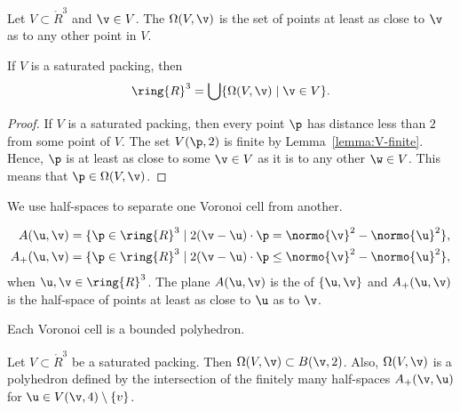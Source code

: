 \begin{definition}\label{def:voronoi} 
Let $V\subset\ring{R}^3$ and $\v\in V$.
The  
$\Omega(V,\v)$
is the set of points at least as close to $\v$ as to
any other point in $V$. 
\end{definition}

\figXOHAZWO %

\begin{lemma}
If $V$ is a saturated packing, then 
\begin{equation}\label{eqn:vor-rn} 
\ring{R}^3 = \bigcup \{\Omega(V,\v)\mid \v \in V\}.
\end{equation}
\end{lemma}

\begin{proof}
  If $V$ is a saturated packing, then every point $\p$ has distance 
  less than $2$ from some point of $V$.  The set $V(\p,2)$ is finite
  by Lemma~\ref{lemma:V-finite}.  Hence, $\p$ is at least as close to
  some $\v\in V$ as it is to any other $\w\in V$.  This means that
  $\p\in\Omega(V,\v)$.  
\end{proof}

We use half-spaces to separate one Voronoi cell from another.

\begin{definition}
\begin{align*} 
A(\u,\v) &= \{\p\in\ring{R}^3
\mid 2(\v-\u)\cdot \p = \normo{\v}^2 - \normo{\u}^2 \},\\
A_+(\u,\v) &= \{\p\in\ring{R}^3
\mid 2(\v-\u)\cdot \p \le \normo{\v}^2 - \normo{\u}^2 \},
\end{align*}
when $\u,\v\in\ring{R}^3$.  The plane $A(\u,\v)$ is the  of
$\{\u,\v\}$ and $A_+(\u,\v)$ is the half-space of points at least as
close to $\u$ as to $\v$.  
\end{definition}

Each Voronoi cell is a bounded polyhedron.

\begin{lemma}\label{lemma:V4} 
  Let $V\subset\ring{R}^3$ be a saturated packing.  Then
  $\Omega(V,\v)\subset B(\v,2)$.  Also, $\Omega(V,\v)$ is a polyhedron
  defined by the intersection of the finitely many half-spaces
  $A_+(\v,\u)$ for $\u\in V(\v,4)\setminus\{v\}$.
\end{lemma}

